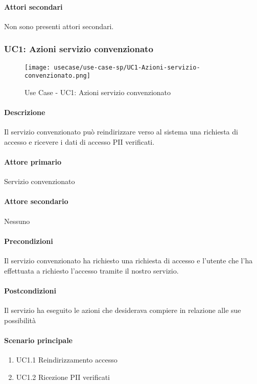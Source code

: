 \paragraph{Attori secondari}
Non sono presenti attori secondari.




\subsubsection{UC1: Azioni servizio convenzionato}
\begin{figure}[!htbp] 
    \centering 
    \texttt{[image: usecase/use-case-sp/UC1-Azioni-servizio-convenzionato.png]} 
    \caption{Use Case - UC1: Azioni servizio convenzionato}
\end{figure}

\paragraph{Descrizione}  Il servizio convenzionato può reindirizzare verso al sistema una richiesta di accesso e ricevere i dati di accesso PII verificati.
\paragraph{Attore primario}  Servizio convenzionato
\paragraph{Attore secondario}  Nessuno
\paragraph{Precondizioni}  Il servizio convenzionato ha richiesto una richiesta di accesso e l’utente che l’ha effettuata a richiesto l’accesso tramite il nostro servizio.
\paragraph{Postcondizioni}  Il servizio ha eseguito le azioni che desiderava compiere in relazione alle sue possibilità
\paragraph{Scenario principale}  
    \begin{enumerate}
        \item UC1.1 Reindirizzamento accesso
        \item UC1.2 Ricezione PII verificati
    \end{enumerate}
